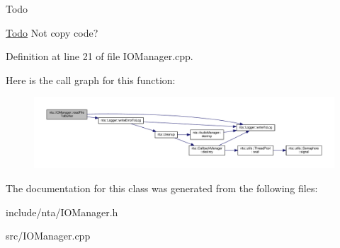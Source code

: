 \begin{DoxyRefDesc}{Todo}
\item[\hyperlink{todo__todo000007}{Todo}]Not copy code? \end{DoxyRefDesc}


Definition at line 21 of file I\+O\+Manager.\+cpp.

Here is the call graph for this function\+:\nopagebreak
\begin{figure}[H]
\begin{center}
\leavevmode
\includegraphics[width=350pt]{d2/d54/classnta_1_1IOManager_abbfd9da05b22aa488043a19344d38e0a_cgraph}
\end{center}
\end{figure}


The documentation for this class was generated from the following files\+:\begin{DoxyCompactItemize}
\item 
include/nta/I\+O\+Manager.\+h\item 
src/I\+O\+Manager.\+cpp\end{DoxyCompactItemize}
